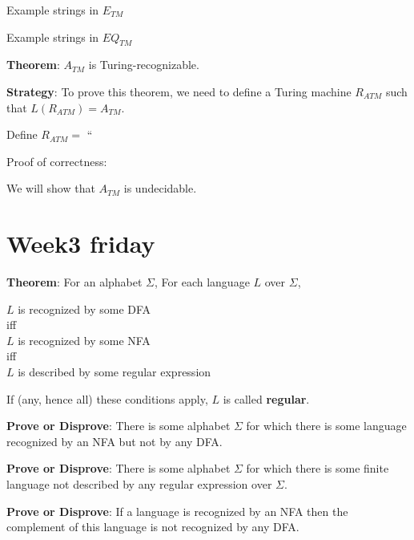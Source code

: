 \documentclass[12pt, oneside]{article}
\begin{document}
\vfill

Example strings in  $E_{TM}$

\vfill

Example strings in  $EQ_{TM}$

\vfill

\newpage

{\bf  Theorem}: $A_{TM}$  is  Turing-recognizable.


{\bf  Strategy}:  To prove this theorem, we need  to  define  a Turing  machine  $R_{ATM}$ such that 
$L(R_{ATM}) = A_{TM}$.


Define $R_{ATM} =  $ ``

\vspace{150pt}


Proof of correctness: 


\vfill
\vfill

We will show that $A_{TM}$ is undecidable. \vfill
\section*{Week3 friday}



{\bf Theorem}: For an alphabet $\Sigma$, For each language $L$ over $\Sigma$, 
\begin{center}
$L$ is recognized by some DFA \\
iff\\
$L$ is recognized by some NFA\\
iff\\
$L$ is described by some regular expression
\end{center}
If (any, hence all) these conditions apply, $L$ is called {\bf regular}.



{\bf Prove or Disprove}: There is some alphabet $\Sigma$ for which there is 
some language recognized by an NFA but not by any DFA.

\vspace{30pt}

{\bf Prove or Disprove}: There is some alphabet $\Sigma$ for which there is 
some finite language not described by any regular expression over $\Sigma$.

\vspace{30pt}


{\bf Prove or Disprove}: If a language is recognized by an NFA 
then the complement of this language is not recognized by any DFA.

\vspace{30pt}
\end{document}
